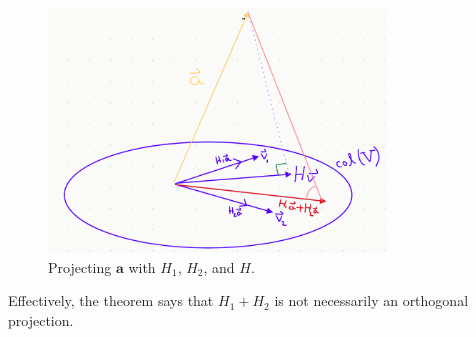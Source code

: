 \documentclass[12pt, a4paper]{article}
\theoremstyle{definition}
\begin{document}
	\begin{figure}
		\centering
		\includegraphics[width=0.8\textwidth]{sum-of-orthogonal-projections}
		\caption{Projecting $\mathbf{a}$ with $H_1$, $H_2$, and $H$.}
		\label{fig:sum-of-orthogonal-projections}
	\end{figure}
	Effectively, the theorem says that $H_1+H_2$ is not necessarily an orthogonal projection.
\end{document}
